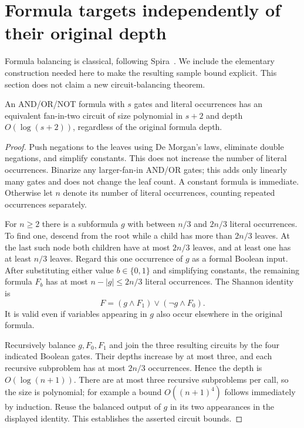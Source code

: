 \section{Formula targets independently of their original depth}
\label{sec:formula-balancing}

Formula balancing is classical, following Spira~\cite{spira1971}.
We include the elementary construction needed here to make the resulting
sample bound explicit. This section does not claim a new circuit-balancing
theorem.

\begin{lemma}
\label{lem:formula-balancing}
An AND/OR/NOT formula with $s$ gates and literal occurrences has an
equivalent fan-in-two circuit of size polynomial in $s+2$ and depth
$O(\log(s+2))$, regardless of the original formula depth.
\end{lemma}

\begin{proof}
Push negations to the leaves using De Morgan's laws, eliminate double
negations, and simplify constants. This does not increase the number
of literal occurrences. Binarize any larger-fan-in AND/OR gates; this
adds only linearly many gates and does not change the leaf count.
A constant formula is immediate. Otherwise
let $n$ denote its number of literal occurrences, counting repeated
occurrences separately.

For $n\ge2$ there is a subformula $g$ with between $n/3$ and $2n/3$
literal occurrences. To find one, descend from the root while a child
has more than $2n/3$ leaves. At the last such node both children have
at most $2n/3$ leaves, and at least one has at least $n/3$ leaves.
Regard this one occurrence of $g$ as a formal Boolean input. After
substituting either value $b\in\{0,1\}$ and simplifying constants,
the remaining formula $F_b$ has at most $n-|g|\le2n/3$ literal
occurrences. The Shannon identity is
\[
 F=(g\wedge F_1)\vee(\neg g\wedge F_0).
\]
It is valid even if variables appearing in $g$ also occur elsewhere
in the original formula.

Recursively balance $g,F_0,F_1$ and join the three resulting circuits
by the four indicated Boolean gates. Their depths increase by at most
three, and each recursive subproblem has at most $2n/3$ occurrences.
Hence the depth is $O(\log(n+1))$. There are at most three recursive
subproblems per call, so the size is polynomial; for example a bound
$O((n+1)^4)$ follows immediately by induction. Reuse the balanced
output of $g$ in its two appearances in the displayed identity.
This establishes the asserted circuit bounds.
\end{proof}

